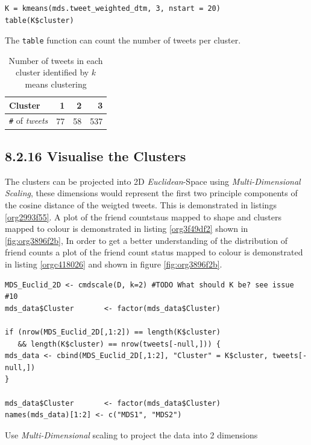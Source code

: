 \documentclass[11pt]{article}
\begin{document}
\begin{listing}[htbp]
\begin{verbatim}
K = kmeans(mds.tweet_weighted_dtm, 3, nstart = 20)
table(K$cluster)
\end{verbatim}
\caption{\label{org92a0b7f}The \texttt{table} function can count the number of tweets per cluster.}
\end{listing}

\begin{table}[htbp]
\caption{\label{tab:org865a064}Number of tweets in each cluster identified by \(k\) means clustering}
\centering
\begin{tabular}{lrrr}
Cluster & 1 & 2 & 3\\
\hline
\texttt{\#} of \emph{tweets} & 77 & 58 & 537\\
\end{tabular}
\end{table}

\subsection{8.2.16 Visualise the Clusters}
\label{sec:org677044a}
The clusters can be projected into 2D \emph{Euclidean}-Space using \emph{Multi-Dimensional
Scaling}, these dimensions would represent the first two principle components of
the cosine distance of the weigted tweets. This is demonstrated in listings
\ref{org2993f55}. A plot of the friend countstaus mapped to shape and clusters mapped to
colour is demonstrated in listing \ref{org3f49df2} shown in \ref{fig:org3896f2b}, In order to get a better
understanding of the distribution of friend counts a plot of the friend count
status mapped to colour is demonstrated in listing \ref{orgc418026} and shown in figure \ref{fig:org3896f2b}.


\begin{listing}[htbp]
\begin{verbatim}
MDS_Euclid_2D <- cmdscale(D, k=2) #TODO What should K be? see issue #10
mds_data$Cluster       <- factor(mds_data$Cluster)

if (nrow(MDS_Euclid_2D[,1:2]) == length(K$cluster)
   && length(K$cluster) == nrow(tweets[-null,])) {
mds_data <- cbind(MDS_Euclid_2D[,1:2], "Cluster" = K$cluster, tweets[-null,])
}

mds_data$Cluster       <- factor(mds_data$Cluster)
names(mds_data)[1:2] <- c("MDS1", "MDS2")
\end{verbatim}
\caption{\label{org2993f55}Use \emph{Multi-Dimensional} scaling to project the data into 2 dimensions}
\end{listing}
\end{document}
